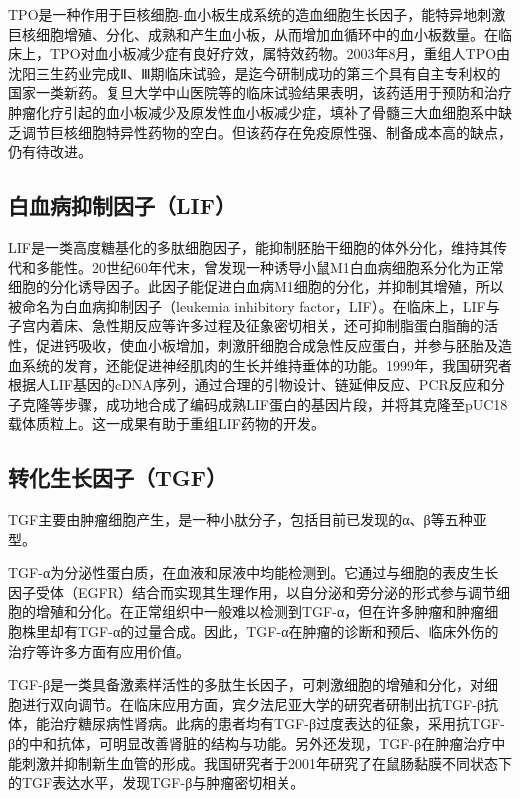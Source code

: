 TPO是一种作用于巨核细胞-血小板生成系统的造血细胞生长因子，能特异地刺激巨核细胞增殖、分化、成熟和产生血小板，从而增加血循环中的血小板数量。在临床上，TPO对血小板减少症有良好疗效，属特效药物。2003年8月，重组人TPO由沈阳三生药业完成Ⅱ、Ⅲ期临床试验，是迄今研制成功的第三个具有自主专利权的国家一类新药。复旦大学中山医院等的临床试验结果表明，该药适用于预防和治疗肿瘤化疗引起的血小板减少及原发性血小板减少症，填补了骨髓三大血细胞系中缺乏调节巨核细胞特异性药物的空白。但该药存在免疫原性强、制备成本高的缺点，仍有待改进。


\subsection{白血病抑制因子（LIF）}

LIF是一类高度糖基化的多肽细胞因子，能抑制胚胎干细胞的体外分化，维持其传代和多能性。20世纪60年代末，曾发现一种诱导小鼠M1白血病细胞系分化为正常细胞的分化诱导因子。此因子能促进白血病M1细胞的分化，并抑制其增殖，所以被命名为白血病抑制因子（leukemia
inhibitory
factor，LIF）。在临床上，LIF与子宫内着床、急性期反应等许多过程及征象密切相关，还可抑制脂蛋白脂酶的活性，促进钙吸收，使血小板增加，刺激肝细胞合成急性反应蛋白，并参与胚胎及造血系统的发育，还能促进神经肌肉的生长并维持垂体的功能。1999年，我国研究者根据人LIF基因的cDNA序列，通过合理的引物设计、链延伸反应、PCR反应和分子克隆等步骤，成功地合成了编码成熟LIF蛋白的基因片段，并将其克隆至pUC18载体质粒上。这一成果有助于重组LIF药物的开发。


\subsection{转化生长因子（TGF）}

TGF主要由肿瘤细胞产生，是一种小肽分子，包括目前已发现的α、β等五种亚型。

TGF-α为分泌性蛋白质，在血液和尿液中均能检测到。它通过与细胞的表皮生长因子受体（EGFR）结合而实现其生理作用，以自分泌和旁分泌的形式参与调节细胞的增殖和分化。在正常组织中一般难以检测到TGF-α，但在许多肿瘤和肿瘤细胞株里却有TGF-α的过量合成。因此，TGF-α在肿瘤的诊断和预后、临床外伤的治疗等许多方面有应用价值。

TGF-β是一类具备激素样活性的多肽生长因子，可刺激细胞的增殖和分化，对细胞进行双向调节。在临床应用方面，宾夕法尼亚大学的研究者研制出抗TGF-β抗体，能治疗糖尿病性肾病。此病的患者均有TGF-β过度表达的征象，采用抗TGF-β的中和抗体，可明显改善肾脏的结构与功能。另外还发现，TGF-β在肿瘤治疗中能刺激并抑制新生血管的形成。我国研究者于2001年研究了在鼠肠黏膜不同状态下的TGF表达水平，发现TGF-β与肿瘤密切相关。

